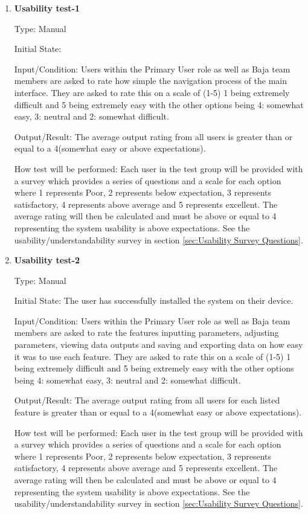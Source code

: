 \documentclass[12pt, titlepage]{article}
\begin{document}
\begin{enumerate}
  \item {} \hypertarget{Usability test-1}{\textbf{Usability test-1}} \label{Usability test-1}


Type: Manual
					
Initial State: 
					
Input/Condition: Users within the Primary User role as well as Baja team members are asked to rate how simple the navigation process of the main interface. 
They are asked to rate this on a scale of (1-5) 1 being extremely difficult and 5 being extremely easy with the other options being 4: somewhat easy, 3: neutral and 2: somewhat difficult. 
					
Output/Result: The average output rating from all users is greater than or equal to a 4(somewhat easy or above expectations).
					
How test will be performed: Each user in the test group will be provided with a survey which provides a series of questions and a scale for each option where 1 represents Poor, 2 represents below expectation, 3 represents satisfactory, 4 represents above average and 5 represents excellent.
The average rating will then be calculated and must be above or equal to 4 representing the system usability is above expectations. See the usability/understandability survey in section \ref{sec:Usability Survey Questions}. 

\item {} \hypertarget{Usability test-2}{\textbf{Usability test-2}} \label{Usability test-2}
  
Type: Manual
            
Initial State: The user has successfully installed the system on their device.
            
Input/Condition: Users within the Primary User role as well as Baja team members are asked to rate the features inputting parameters, adjusting parameters, viewing data outputs and saving and exporting data on how easy it was to use each feature.
They are asked to rate this on a scale of (1-5) 1 being extremely difficult and 5 being extremely easy with the other options being 4: somewhat easy, 3: neutral and 2: somewhat difficult. 
            
Output/Result: The average output rating from all users for each listed feature is greater than or equal to a 4(somewhat easy or above expectations).
            
How test will be performed: Each user in the test group will be provided with a survey which provides a series of questions and a scale for each option where 1 represents Poor, 2 represents below expectation, 3 represents satisfactory, 4 represents above average and 5 represents excellent.
The average rating will then be calculated and must be above or equal to 4 representing the system usability is above expectations. 
See the usability/understandability survey in section \ref{sec:Usability Survey Questions}. 
  
\end{enumerate}
\end{document}
